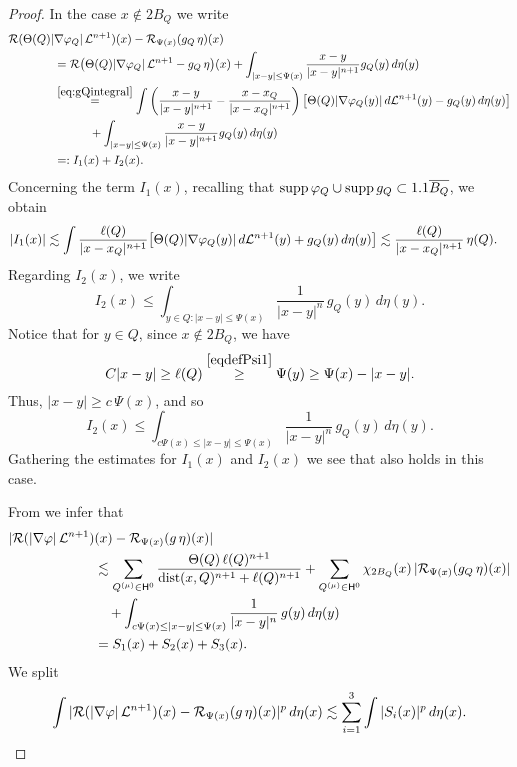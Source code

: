 \begin{proof}
In the case $x\not\in 2B_Q$ we write
\begin{align*}
{\mathcal R}(\Theta(Q)|&\nabla{\varphi}_Q|\,{\mathcal L}^{n+1})(x) - {\mathcal R}_{\Psi(x)}(g_Q\,\eta)(x)\\  &=
{\mathcal R}\big(\Theta(Q)|\nabla{\varphi}_Q|\,{\mathcal L}^{n+1} - g_Q\,\eta\big)(x) +
\int_{|x-y|\leq\Psi(x)} \frac{x-y}{|x-y|^{n+1}} g_Q(y)\,d\eta(y)\\
& \overset{\eqref{eq:gQintegral}}{=} 
\int \left(\frac{x-y}{|x-y|^{n+1}} - \frac{x-x_Q}{|x-x_Q|^{n+1}}\right) \bigl[\Theta(Q)|\nabla{\varphi}_Q(y)|\,d{\mathcal L}^{n+1}(y) - g_Q(y)\,d\eta(y)\bigr]\\
& \quad\quad\quad + \int_{|x-y|\leq\Psi(x)} \frac{x-y}{|x-y|^{n+1}} g_Q(y)\,d\eta(y)\\
& =: I_1(x)+ I_2(x).
\end{align*}
Concerning the term $I_1(x)$, recalling that $\operatorname{supp}{\varphi}_Q \cup\operatorname{supp} g_Q\subset 1.1\overline{ B_Q}$,
we obtain
\begin{align*}
|I_1(x)|
&\lesssim \int \frac{\ell(Q)}{|x-x_Q|^{n+1}} \bigl[\Theta(Q)|\nabla{\varphi}_Q(y)|\,d{\mathcal L}^{n+1}(y) + g_Q(y)\,d\eta(y)\bigr]
\lesssim \frac{\ell(Q)}{|x-x_Q|^{n+1}}\,\eta(Q).
\end{align*}
Regarding $I_2(x)$, we write
$$
I_2(x)\leq \int_{y\in Q:|x-y|\leq\Psi(x)} \frac1{|x-y|^{n}} \,g_Q(y)\,d\eta(y).$$
Notice that for $y\in Q$, since $x\notin 2B_Q$, we have
$$C|x-y|\geq \ell(Q)\overset{\eqref{eqdefPsi1}}{\ge}\Psi(y) \geq \Psi(x) - |x-y|.$$
Thus, $|x-y|\geq c\,\Psi(x)$, and so
$$I_2(x)\leq \int_{c\Psi(x)\leq |x-y|\leq\Psi(x)} \frac1{|x-y|^{n}}\, g_Q(y)\,d\eta(y).
$$
Gathering the estimates for $I_1(x)$ and $I_2(x)$ we see that  also holds in this case.


From  we infer that
\begin{align*}
|{\mathcal R}(|\nabla{\varphi}|\,{\mathcal L}^{n+1})&(x) - {\mathcal R}_{\Psi(x)}(g\,\eta)(x)|\\
& \lesssim \sum_{Q^{(\mu)}\in {\mathsf{H}}^0}\frac{\Theta(Q)\,\ell(Q)^{n+1}}{{\rm dist}(x,Q)^{n+1}+
\ell(Q)^{n+1}} + 
\sum_{Q^{(\mu)}\in {\mathsf{H}}^0} \chi_{2B_Q}(x)\, |{\mathcal R}_{\Psi(x)}(g_Q\,\eta)(x)|\\
&\quad + \int_{c\Psi(x)\leq |x-y|\leq\Psi(x)} \frac1{|x-y|^{n}}\, g(y)\,d\eta(y)\\
& = S_1(x) + S_2(x) + S_3(x).
\end{align*}
We split
\begin{equation}\label{eqs123}
\int |{\mathcal R}(|\nabla{\varphi}|\,{\mathcal L}^{n+1})(x) - {\mathcal R}_{\Psi(x)}(g\,\eta)(x)|^p\,d\eta(x)
\lesssim \sum_{i=1}^3 \int |S_i(x)|^p\,d\eta(x).
\end{equation}


\end{proof}
